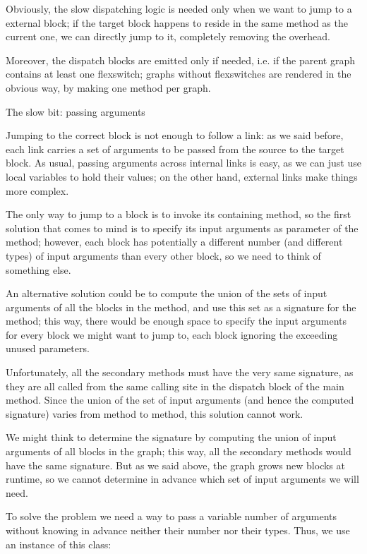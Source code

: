 {Obviously, the slow dispatching logic is needed only when we want to jump to a external block; if the target block happens to reside in the same method as the current one, we can directly jump to it, completely removing the overhead.

Moreover, the dispatch blocks are emitted only if needed, i.e. if the parent graph contains at least one flexswitch; graphs without flexswitches are rendered in the obvious way, by making one method per graph.

The slow bit: passing arguments

Jumping to the correct block is not enough to follow a link: as we said before, each link carries a set of arguments to be passed from the source to the target block. As usual, passing arguments across internal links is easy, as we can just use local variables to hold their values; on the other hand, external links make things more complex.

The only way to jump to a block is to invoke its containing method, so the first solution that comes to mind is to specify its input arguments as parameter of the method; however, each block has potentially a different number (and different types) of input arguments than every other block, so we need to think of something else.

An alternative solution could be to compute the union of the sets of input arguments of all the blocks in the method, and use this set as a signature for the method; this way, there would be enough space to specify the input arguments for every block we might want to jump to, each block ignoring the exceeding unused parameters.

Unfortunately, all the secondary methods must have the very same signature, as they are all called from the same calling site in the dispatch block of the main method. Since the union of the set of input arguments (and hence the computed signature) varies from method to method, this solution cannot work.

We might think to determine the signature by computing the union of input arguments of all blocks in the graph; this way, all the secondary methods would have the same signature. But as we said above, the graph grows new blocks at runtime, so we cannot determine in advance which set of input arguments we will need.

To solve the problem we need a way to pass a variable number of arguments without knowing in advance neither their number nor their types. Thus, we use an instance of this class:

}
